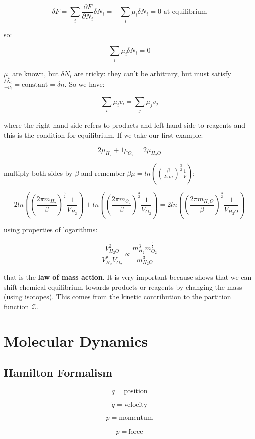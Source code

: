 \documentclass[a4paper, italian, openany]{book}
\begin{document}
$$\delta F = \sum_i \frac{\partial F}{\partial N_i} \delta N_i = -\sum_i \mu_i \delta N_i = 0 \mbox{ at equilibrium}$$

so:

$$\sum_i \mu_i \delta N_i = 0$$

$\mu_i$ are known, but $\delta N_i$ are tricky: they can't be arbitrary, but must satisfy $\frac{\delta N_i}{\pm \nu_i} = \mbox{constant} = \delta n$. So we have:

$$\sum_i \mu_i v_i = \sum_j \mu_j v_j$$

where the right hand side refers to products and left hand side to reagents and this is the condition for equilibrium.\newline
If we take our first example:

$$2 \mu_{H_2} + 1\mu_{O_2} = 2\mu_{H_2O}$$

multiply both sides by $\beta$ and remember $\beta \mu = ln \left ( \left ( \frac{\beta}{2\pi m} \right )^{\frac{3}{2}} \frac{1}{V} \right )$:

$$2 ln \left ( \left ( \frac{2\pi m_{H_2}}{\beta} \right )^{\frac{3}{2}} \frac{1}{V_{H_2}} \right ) + ln \left ( \left ( \frac{2\pi m_{O_2}}{\beta} \right )^{\frac{3}{2}} \frac{1}{V_{O_2}} \right ) = 2ln \left ( \left ( \frac{2\pi m_{H_2O}}{\beta} \right )^{\frac{3}{2}} \frac{1}{V_{H_2O}} \right )$$

using properties of logarithms:

$$\frac{V_{H_2O}^2}{V_{H_2}^2V_{O_2}} \propto \frac{m_{H_2}^3 m_{O_2}^\frac{3}{2}}{m_{H_2O}^3}$$

that is the \textbf{law of mass action}. It is very important because shows that we can shift chemical equilibrium towards products or reagents by changing the mass (using isotopes). This comes from the kinetic contribution to the partition function $\mathcal{Z}$.

\chapter{Molecular Dynamics}

\section{Hamilton Formalism}

$$q = \mbox{position}$$

$$\dot{q} = \mbox{velocity}$$

$$p = \mbox{momentum}$$

$$\dot{p} = \mbox{force}$$
\end{document}
